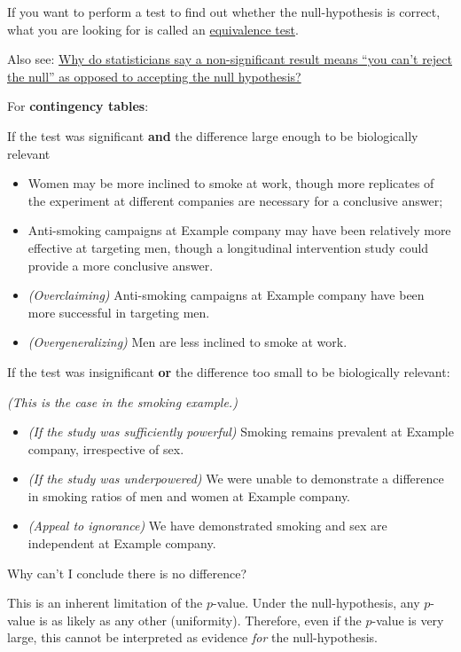 \documentclass[
]{book}
\providecommand{\tightlist}{%
  \setlength{\itemsep}{0pt}\setlength{\parskip}{0pt}}
\begin{document}
If you want to perform a test to find out whether the null-hypothesis is correct, what you are looking for is called an \href{https://en.wikipedia.org/wiki/Equivalence_test}{equivalence test}.

Also see: \href{https://stats.stackexchange.com/a/85914/176202}{Why do statisticians say a non-significant result means ``you can't reject the null'' as opposed to accepting the null hypothesis?}

For \textbf{contingency tables}:

If the test was significant \textbf{and} the difference large enough to be biologically relevant

\begin{itemize}
\tightlist
\item
  Women may be more inclined to smoke at work, though more replicates of the experiment at different companies are necessary for a conclusive answer;
\item
  Anti-smoking campaigns at Example company may have been relatively more effective at targeting men, though a longitudinal intervention study could provide a more conclusive answer.
\item
  \emph{(Overclaiming)} Anti-smoking campaigns at Example company have been more successful in targeting men.
\item
  \emph{(Overgeneralizing)} Men are less inclined to smoke at work.
\end{itemize}

If the test was insignificant \textbf{or} the difference too small to be biologically relevant:

\emph{(This is the case in the smoking example.)}

\begin{itemize}
\tightlist
\item
  \emph{(If the study was sufficiently powerful)} Smoking remains prevalent at Example company, irrespective of sex.
\item
  \emph{(If the study was underpowered)} We were unable to demonstrate a difference in smoking ratios of men and women at Example company.
\item
  \emph{(Appeal to ignorance)} We have demonstrated smoking and sex are independent at Example company.
\end{itemize}

Why can't I conclude there is no difference?

This is an inherent limitation of the \(p\)-value. Under the null-hypothesis, any \(p\)-value is as likely as any other (uniformity). Therefore, even if the \(p\)-value is very large, this cannot be interpreted as evidence \emph{for} the null-hypothesis.
\end{document}

